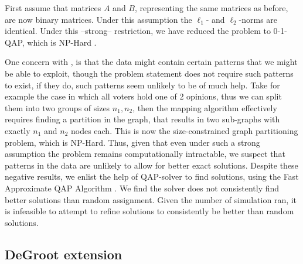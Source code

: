 \begin{proofc}{}
	First assume that matrices $A$ and $B$, representing the same matrices as before, are now binary matrices. Under this assumption the $\ell_1$- and $\ell_2$-norms are identical. Under this --strong-- restriction, we have reduced the problem to 0-1-QAP, which is NP-Hard \cite{nagarajanMaximumQuadraticAssignment}.
\end{proofc}

One concern with , is that the data might
contain certain patterns that we might be able to exploit, though the problem statement does not
require such patterns to exist, if they do, such patterns seem
unlikely to be of much help. Take for example the case in which all voters hold
one of 2 opinions, thus we can split them into two groups of sizes $n_1, n_2$,
then the mapping algorithm effectively requires finding a partition in the graph, that
results in two sub-graphs with exactly $n_1$ and $n_2$ nodes each. This is now
the size-constrained graph partitioning problem, which is NP-Hard. Thus, given that even under
such a strong assumption the problem remains computationally intractable, we suspect that
patterns in the data are unlikely to allow for better exact solutions. 
Despite these negative results, we enlist the help of QAP-solver
\cite{virtanenSciPy10Fundamental2020}  to find solutions, using the Fast
Approximate QAP Algorithm \cite{vogelsteinFastApproximateQuadratic2015}. We
find the solver does not consistently find better solutions than random
assignment. Given the number of simulation ran, it is infeasible to attempt to
refine solutions to consistently be better than random solutions.


\subsection{DeGroot extension}

